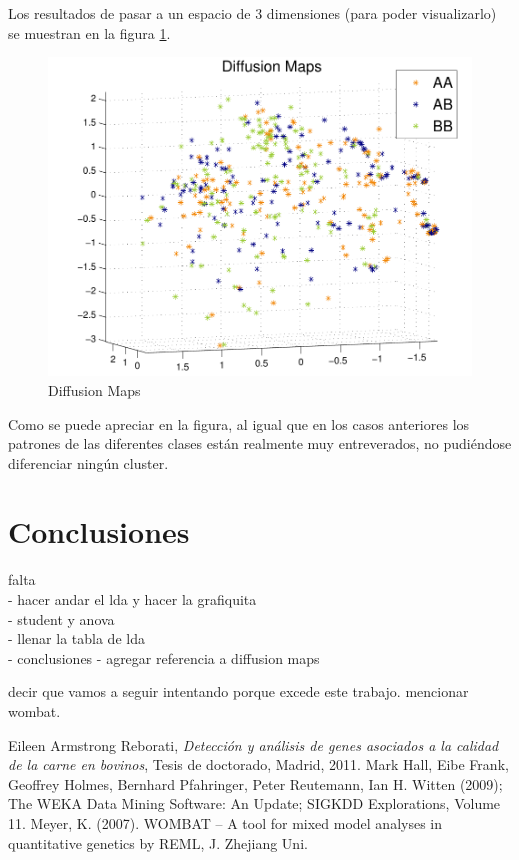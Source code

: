 \documentclass[12pt,a4paper,titlepage]{report}
\begin{document}
Los resultados de pasar a un espacio de 3 dimensiones (para poder visualizarlo) se muestran en la figura \ref{fig:dm}.
\begin{figure}[H]
	\centering 
	\includegraphics[width=.8\textwidth]{./pics/dm.pdf}
	\caption{Diffusion Maps}
	\label{fig:dm}
\end{figure}

Como se puede apreciar en la figura, al igual que en los casos anteriores los patrones de las diferentes clases están realmente muy entreverados, no pudiéndose diferenciar ningún cluster.


\chapter{Conclusiones}
falta\\
- hacer andar el lda y hacer la grafiquita\\
- student y anova\\
- llenar la tabla de lda\\
- conclusiones
- agregar referencia a diffusion maps

decir que vamos a seguir intentando porque excede este trabajo. mencionar wombat.



\begin{thebibliography}{99}
\begin{small}

Eileen Armstrong Reborati, \emph{Detección y análisis de genes asociados a la calidad de la carne en bovinos}, Tesis de doctorado, Madrid, 2011.
Mark Hall, Eibe Frank, Geoffrey Holmes, Bernhard Pfahringer, Peter Reutemann, Ian H. Witten (2009); The WEKA Data Mining Software: An Update; SIGKDD Explorations, Volume 11.
Meyer, K. (2007). WOMBAT – A tool for mixed model analyses in quantitative genetics by REML, J. Zhejiang Uni.

\end{small}
\end{thebibliography}
\end{document}
